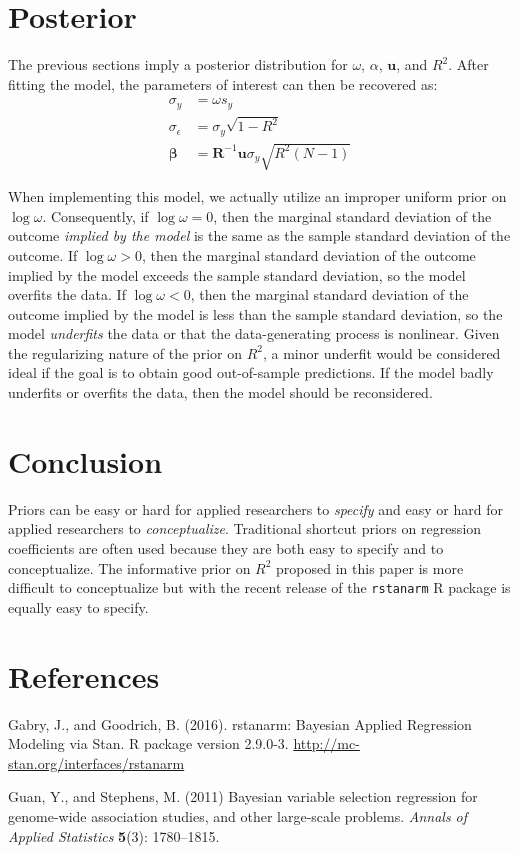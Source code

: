 \documentclass[11pt]{article}
\begin{document}
\section{Posterior}

The previous sections imply a posterior distribution for $\omega$, $\alpha$,
$\mathbf{u}$, and $R^2$. After fitting the model, the parameters of interest can
then be recovered as:
%
\begin{align*}
\sigma_y
  &= \omega s_y \\
\sigma_{\epsilon}
  &= \sigma_y \sqrt{1 - R^2} \\
\boldsymbol{\beta}
  &= \mathbf{R}^{-1} \mathbf{u} \sigma_y \sqrt{R^2 \left(N-1\right)}
\end{align*}

When implementing this model, we actually utilize an improper uniform prior on
$\log \omega$. Consequently, if $\log \omega = 0$, then the marginal standard
deviation of the outcome \emph{implied by the model} is the same as the sample
standard deviation of the outcome. If $\log \omega > 0$, then the marginal
standard deviation of the outcome implied by the model exceeds the sample
standard deviation, so the model overfits the data. If $\log \omega < 0$, then
the marginal standard deviation of the outcome implied by the model is less than
the sample standard deviation, so the model \emph{underfits} the data or that
the data-generating process is nonlinear. Given the regularizing nature of the
prior on $R^2$, a minor underfit would be considered ideal if the goal is to
obtain good out-of-sample predictions. If the model badly underfits or overfits
the data, then the model should be reconsidered.



\section{Conclusion}

Priors can be easy or hard for applied researchers to \emph{specify} and easy or
hard for applied researchers to \emph{conceptualize}. Traditional shortcut
priors on regression coefficients are often used because they are both easy to
specify and to conceptualize. The informative prior on $R^2$ proposed in this
paper is more difficult to conceptualize but with the recent release of the
{\tt rstanarm} R package is equally easy to specify.


\section*{References}

\noindent

\bibitem Gabry, J., and Goodrich, B. (2016). rstanarm: Bayesian Applied
Regression Modeling via Stan. R package version 2.9.0-3.
\url{http://mc-stan.org/interfaces/rstanarm}

\bibitem Guan, Y., and Stephens, M. (2011) Bayesian variable selection
regression for genome-wide association studies, and other large-scale problems.
\emph{Annals of Applied Statistics} {\bf 5}(3): 1780--1815.



\end{document}
